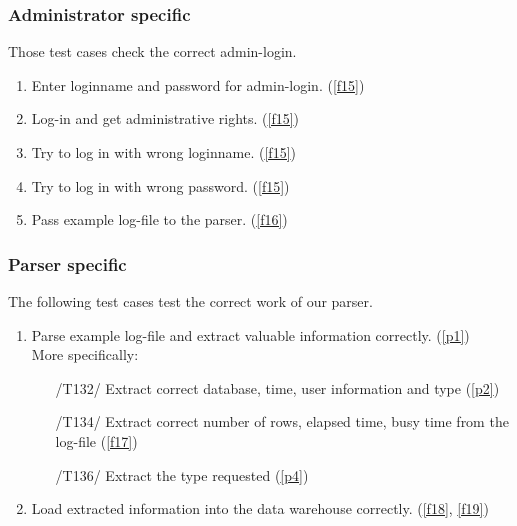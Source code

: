 \subsubsection{Administrator specific}

Those test cases check the correct admin-login.

\begin{enumerate}[resume]

\item Enter loginname and password for admin-login. (\ref{f15})
\label{t17}

\item Log-in and get administrative rights. (\ref{f15})
\label{t18}

\item Try to log in with wrong loginname. (\ref{f15})
\label{t19}

\item Try to log in with wrong password. (\ref{f15})
\label{t20}

\item Pass example log-file to the parser. (\ref{f16})
\label{t21}


\end{enumerate}

\subsubsection{Parser specific}

The following test cases test the correct work of our parser.

\begin{enumerate}[resume]

\item Parse example log-file and extract valuable information correctly. (\ref{p1})
	\\ More specifically: 
\label{t22}
  \begin{enumerate}

	\item[/T132/] Extract correct database, time, user information 
	and type (\ref{p2})
\label{t23}

	\item[/T134/] Extract correct number of rows, elapsed time, 
	busy time from the log-file (\ref{f17})
\label{t24}	
	
	\item[/T136/] Extract the type requested (\ref{p4})
\label{t25}

  \end{enumerate}

\item Load extracted information into the data warehouse correctly. (\ref{f18}, \ref{f19})
\label{t26}

\end{enumerate}


